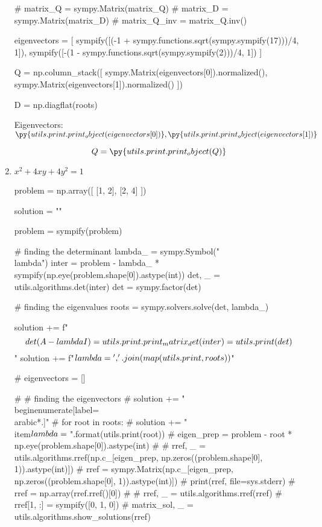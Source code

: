 \documentclass[letterpaper]{article}
\newenvironment{question}[2][Question]{\begin{trivlist}
\item[\hskip \labelsep {\bfseries #1}\hskip \labelsep {\bfseries #2.}]}{\end{trivlist}}
\newcommand{\printobj}[1]{\py{utils.print.print_object(#1)}}
\begin{document}
\begin{question}{6.109}
\begin{enumerate}[label=(\alph*)]
\begin{pycode}
# matrix_Q = sympy.Matrix(matrix_Q)
# matrix_D = sympy.Matrix(matrix_D)
# matrix_Q_inv = matrix_Q.inv()

eigenvectors = [
  sympify([(-1 + sympy.functions.sqrt(sympy.sympify(17)))/4, 1]),
  sympify([-(1 - sympy.functions.sqrt(sympy.sympify(2)))/4, 1])
]

Q = np.column_stack([
  sympy.Matrix(eigenvectors[0]).normalized(),
  sympy.Matrix(eigenvectors[1]).normalized()
])

D = np.diagflat(roots)
    \end{pycode}

    Eigenvectors: $\printobj{eigenvectors[0]}, \printobj{eigenvectors[1]}$

    $$Q = \printobj{Q}$$


    \item $x^{2}+4 x y+4 y^{2}=1$
    \begin{pycode}
problem = np.array([
  [1, 2],
  [2, 4]
])

solution = ""

problem = sympify(problem)

# finding the determinant 
lambda_ = sympy.Symbol("\\lambda")
inter = problem - lambda_ * sympify(np.eye(problem.shape[0]).astype(int))
det, _ = utils.algorithms.det(inter)
det = sympy.factor(det)

# finding the eigenvalues
roots = sympy.solvers.solve(det, lambda_)

solution += f"$$\\det(A - \\lambda I) = {utils.print.print_matrix_det(inter)} = {utils.print(det)}$$\n"
solution += f"$\\lambda = {', '.join(map(utils.print, roots))}$\n"

# eigenvectors = []

# # finding the eigenvectors 
# solution += "\\begin{enumerate}[label=\\arabic*.]\n"
# for root in roots:
#   solution += "\\item$\\lambda = {}$\n".format(utils.print(root))
#   eigen_prep = problem - root * np.eye(problem.shape[0]).astype(int)
#   # rref, _ = utils.algorithms.rref(np.c_[eigen_prep, np.zeros((problem.shape[0], 1)).astype(int)])
#   rref = sympy.Matrix(np.c_[eigen_prep, np.zeros((problem.shape[0], 1)).astype(int)])
#   print(rref, file=sys.stderr)
#   rref = np.array(rref.rref()[0])
#   # rref, _ = utils.algorithms.rref(rref)
#   rref[1, :] = sympify([0, 1, 0])
#   matrix_sol, _ = utils.algorithms.show_solutions(rref)


\end{pycode}
\end{enumerate}
\end{question}
\end{document}

